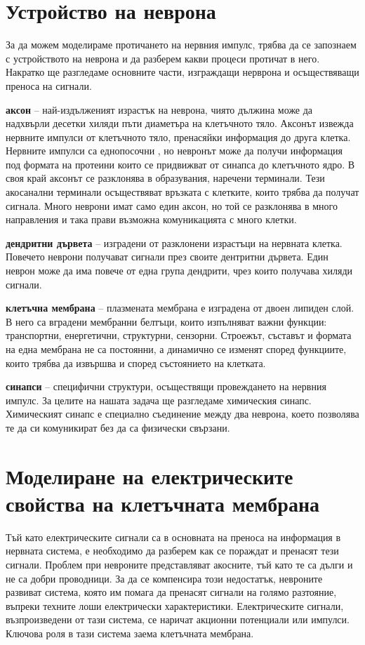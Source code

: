 \documentclass{article}
\begin{document}
\section{Устройство на неврона}
За да можем моделираме протичането на нервния импулс, трябва да се запознаем с устройството на неврона и да разберем какви процеси протичат в него. Накратко ще разгледаме основните части, изграждащи нерврона и осъществяващи преноса на сигнали.

\textbf{аксон} -- най-издълженият израстък на неврона, чиято дължина може да надхвърли десетки хиляди пъти диаметъра на клетъчното тяло. Аксонът
извежда нервните импулси от клетъчното тяло, пренасяйки информация до друга клетка. Нервните импулси са еднопосочни , но невронът
може да получи информация под формата на протеини които се придвижват от синапса до клетъчното ядро. В своя край аксонът се разклонява в образувания, наречени терминали. Тези акосанални терминали осъществяват връзката с клетките, които трябва да получат сигнала.  Много неврони имат само един аксон, но
той се разклонява в много направления и така прави възможна комуникацията с много клетки.

\textbf{дендритни дървета} -- изградени от разклонени израстъци на нервната клетка. Повечето неврони получават сигнали през своите дентритни дървета. Един неврон може да има повече от една група дендрити, чрез които получава хиляди сигнали.

\textbf{клетъчна мембрана} -- плазмената мембрана е изградена от двоен липиден слой. В него са вградени мембранни белтъци, които изпълняват важни функции: транспортни, енергетични, структурни, сензорни. Строежът, съставът и формата на една мембрана не са постоянни, а динамично се изменят според функциите, които трябва да извършва и според състоянието на клетката.

\textbf{синапси} -- специфични структури, осъществящи провеждането на нервния импулс. За целите на нашата задача ще разгледаме химическия синапс. Химическият синапс е специално съединение между два неврона, което позволява те да си комуникират без да са физически свързани.

\section{Моделиране на електрическите свойства на клетъчната мембрана}
Тъй като електрическите сигнали са в основната на преноса на информация в нервната система, е необходимо да разберем как се пораждат и пренасят тези сигнали. Проблем при невроните представляват акосните, тъй като те са дълги и не са добри проводници. За да се компенсира този недостатък, невроните развиват система, която им помага да пренасят сигнали на голямо разтояние, въпреки техните лоши електрически характеристики.  Електрическите сигнали, възпроизведени от тази система, се наричат акционни потенциали или импулси. Ключова роля в тази система заема клетъчната мембрана.
\end{document}

